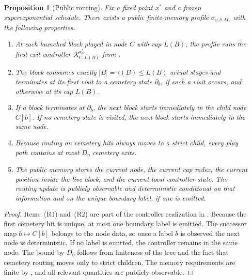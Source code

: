 \documentclass[12pt]{article}
\newtheorem{proposition}[theorem]{Proposition}
\theoremstyle{definition}
\newcommand{\1}{\mathbf{1}}
\begin{document}
\begin{proposition}[Public routing]
\label{prop:public-routing}
Fix a fixed point $x^*$ and a frozen superexponential schedule. There exists a
public finite-memory profile $\sigma_{\eta,\delta,M_*}$ with the following
properties.
\begin{enumerate}[label=\textnormal{(R\arabic*)},leftmargin=2.8em]
\item At each launched block played in node $C$ with cap $L(B)$, the profile runs
the first-exit controller $\mathcal R_{C,L(B)}^{\sigma_C^*}$ from
.
\item The block consumes exactly $|B|=\tau(B)\le L(B)$ actual stages and
terminates at its first visit to a cemetery state $\partial_b$, if such a visit
occurs, and otherwise at its cap $L(B)$.
\item If a block terminates at $\partial_b$, the next block starts immediately in
the child node $C[b]$. If no cemetery state is visited, the next block starts
immediately in the same node.
\item Because routing on cemetery hits always moves to a strict child, every play
path contains at most $D_\eta$ cemetery exits.
\item The public memory stores the current node, the current cap index, the
current position inside the live block, and the current local controller state.
The routing update is publicly observable and deterministic conditional on that
information and on the unique boundary label, if one is emitted.
\end{enumerate}
\end{proposition}

\begin{proof}
Items~(R1) and~(R2) are part of the controller realization in
. Because the first cemetery hit is unique, at most one
boundary label is emitted. The successor map $b\mapsto C[b]$ belongs to the node
data, so once a label $b$ is observed the next node is deterministic. If no label
is emitted, the controller remains in the same node. The bound by $D_\eta$ follows
from finiteness of the tree and the fact that cemetery routing moves only to
strict children. The memory requirements are finite by ,
and all relevant quantities are publicly observable.
\end{proof}
\end{document}
